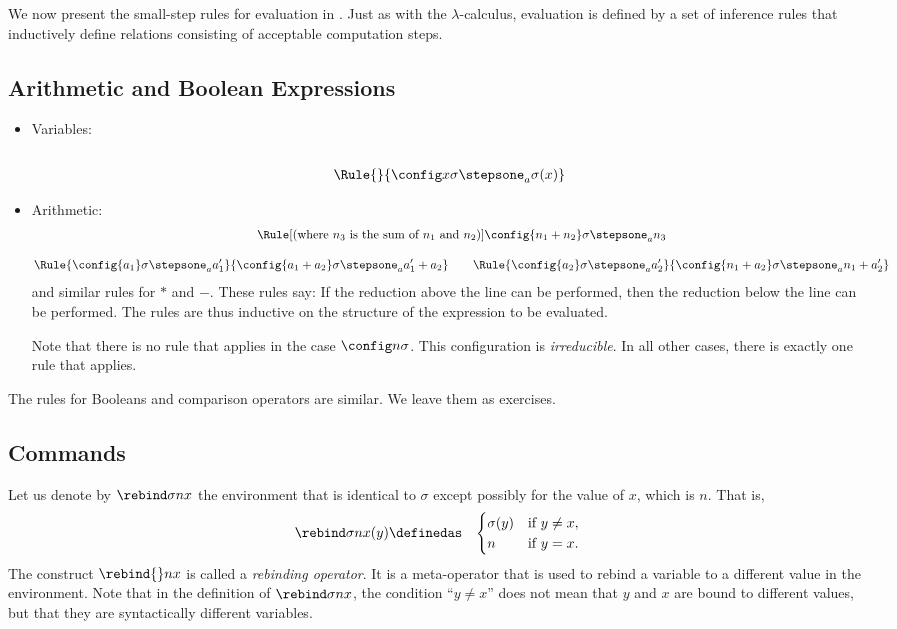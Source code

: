 We now present the small-step rules for evaluation in \IMP. Just as with the
$\lambda$-calculus, evaluation is defined by a set of inference rules
that inductively define relations consisting of acceptable computation steps.

\subsection{Arithmetic and Boolean Expressions}

\begin{itemize}
\item
Variables:\\\
\begin{align*}
\Rule{}{\config x\sigma \stepsone_a \sigma(x)}
\end{align*}
\item
Arithmetic:\\
\begin{gather*}
\Rule[(\text{where $n_3$ is the sum of $n_1$ and $n_2$})]
{}
{\config{n_1+n_2}\sigma \stepsone_a n_3}\\[1em]
\Rule
{\config{a_1}\sigma \stepsone_a a_1'}
{\config{a_1+a_2}\sigma \stepsone_a a_1'+a_2}
\qquad
\Rule
{\config{a_2}\sigma \stepsone_a a_2'}
{\config{n_1+a_2}\sigma \stepsone_a n_1+a_2'}\\
\end{gather*}
and similar rules for $*$ and $-$. These rules say: If the reduction above the line can be performed, then the reduction below the line can be performed. The rules are thus inductive on the structure of the expression to be evaluated.

Note that there is no rule that applies in the case $\config n\sigma$. This configuration is \emph{irreducible}. In all other cases, there is exactly one rule that applies.
\end{itemize}

The rules for Booleans and comparison operators are similar. We leave them as exercises.

\subsection{Commands}

Let us denote by $\rebind\sigma nx$ the environment that is identical to $\sigma$ except possibly for the value of $x$, which is $n$. That is,
\begin{eqnarray*}
\rebind\sigma nx(y) &\definedas&
\begin{cases}
\sigma(y) & \text{if } y\neq x,\\
n & \text{if } y=x.
\end{cases}
\end{eqnarray*}
The construct $\rebind{}nx$ is called a \emph{rebinding operator}. It is a meta-operator that is used to rebind a variable to a different value in the environment. Note that in the definition of $\rebind\sigma nx$, the condition ``$y\neq x$'' does not mean that $y$ and $x$ are bound to different values, but that they are syntactically different variables.

